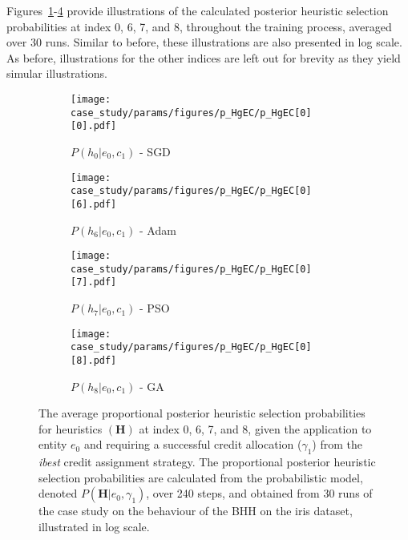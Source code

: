 Figures~\ref{fig:results:case_study:p_HgEC:0:0}-\ref{fig:results:case_study:p_HgEC:0:8} provide illustrations of the calculated posterior heuristic selection probabilities at index 0, 6, 7, and 8, throughout the training process, averaged over 30 runs. Similar to before, these illustrations are also presented in log scale. As before, illustrations for the other indices are left out for brevity as they yield simular illustrations.

\begin{figure}[htb]
	\begin{subfigure}{0.5\textwidth}
		\centering
		\texttt{[image: case\_study/params/figures/p\_HgEC/p\_HgEC[0][0].pdf]}
		\caption{$P(h_{0} \vert e_{0}, c_{1})$ - \acs{SGD}}
		\label{fig:results:case_study:p_HgEC:0:0}
	\end{subfigure}
	\begin{subfigure}{0.5\textwidth}
		\centering
		\texttt{[image: case\_study/params/figures/p\_HgEC/p\_HgEC[0][6].pdf]}
		\caption{$P(h_{6} \vert e_{0}, c_{1})$ - \acs{Adam}}
		\label{fig:results:case_study:p_HgEC:0:6}
	\end{subfigure}
	\par\bigskip
	\begin{subfigure}{0.5\textwidth}
		\centering
		\texttt{[image: case\_study/params/figures/p\_HgEC/p\_HgEC[0][7].pdf]}
		\caption{$P(h_{7} \vert e_{0}, c_{1})$ - \acs{PSO}}
		\label{fig:results:case_study:p_HgEC:0:7}
	\end{subfigure}
	\begin{subfigure}{0.5\textwidth}
		\centering
		\texttt{[image: case\_study/params/figures/p\_HgEC/p\_HgEC[0][8].pdf]}
		\caption{$P(h_{8} \vert e_{0}, c_{1})$ - \acs{GA}}
		\label{fig:results:case_study:p_HgEC:0:8}
	\end{subfigure}
	\par\bigskip
	\caption{The average proportional posterior heuristic selection probabilities for heuristics $(\boldsymbol{H})$ at index 0, 6, 7, and 8, given the application to entity $e_{0}$ and requiring a successful credit allocation ($\gamma_{1}$) from the \textit{ibest} credit assignment strategy. The proportional posterior heuristic selection probabilities are calculated from the probabilistic model, denoted $P(\boldsymbol{H} \vert e_{0}, \gamma_{1})$, over 240 steps, and obtained from 30 runs of the case study on the behaviour of the \acs{BHH} on the iris dataset, illustrated in log scale.}
	\label{fig:results:case_study:p_HgEC:0}
\end{figure}

